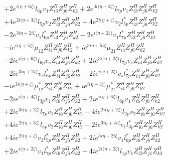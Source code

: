 \begin{align}
 &+2 e^{i \Big(\eta +6 \zeta \Big)} l_{6p} v_1 Z_{{i 3}}^{H} Z_{{j 6}}^{H} Z_{{k 2}}^{H} +2 e^{3 i \Big(\eta +2 \zeta \Big)} l_{7p} v_1 Z_{{i 3}}^{H} Z_{{j 6}}^{H} Z_{{k 2}}^{H} \nonumber \\ 
 &+4 e^{2 i \Big(\eta +3 \zeta \Big)} l_{5p} v_2 Z_{{i 3}}^{H} Z_{{j 6}}^{H} Z_{{k 2}}^{H} -4 e^{2 i \Big(\eta +\zeta \Big)} v_2 l_{5p}^* Z_{{i 3}}^{H} Z_{{j 6}}^{H} Z_{{k 2}}^{H} \nonumber \\ 
 &-2 e^{3 i \eta +2 i \zeta } v_1 l_{6p}^* Z_{{i 3}}^{H} Z_{{j 6}}^{H} Z_{{k 2}}^{H} -2 e^{i \Big(\eta +2 \zeta \Big)} v_1 l_{7p}^* Z_{{i 3}}^{H} Z_{{j 6}}^{H} Z_{{k 2}}^{H} \nonumber \\ 
 &-i e^{i \Big(\eta +5 \zeta \Big)} \mu_{12} Z_{{i 4}}^{H} Z_{{j 6}}^{H} Z_{{k 2}}^{H} +i e^{3 i \eta +5 i \zeta } \mu_{21} Z_{{i 4}}^{H} Z_{{j 6}}^{H} Z_{{k 2}}^{H} \nonumber \\ 
 &-2 i e^{i \Big(\eta +6 \zeta \Big)} l_{6p} v_s Z_{{i 4}}^{H} Z_{{j 6}}^{H} Z_{{k 2}}^{H} +2 i e^{3 i \Big(\eta +2 \zeta \Big)} l_{7p} v_s Z_{{i 4}}^{H} Z_{{j 6}}^{H} Z_{{k 2}}^{H} \nonumber \\ 
 &-2 i e^{3 i \eta +2 i \zeta } v_s l_{6p}^* Z_{{i 4}}^{H} Z_{{j 6}}^{H} Z_{{k 2}}^{H} +2 i e^{i \Big(\eta +2 \zeta \Big)} v_s l_{7p}^* Z_{{i 4}}^{H} Z_{{j 6}}^{H} Z_{{k 2}}^{H} \nonumber \\ 
 &-i e^{3 i \Big(\eta +\zeta \Big)} \mu_{12}^* Z_{{i 4}}^{H} Z_{{j 6}}^{H} Z_{{k 2}}^{H} +i e^{i \Big(\eta +3 \zeta \Big)} \mu_{21}^* Z_{{i 4}}^{H} Z_{{j 6}}^{H} Z_{{k 2}}^{H} \nonumber \\ 
 &-2 i e^{i \Big(\eta +4 \zeta \Big)} l_{3p} v_1 Z_{{i 6}}^{H} Z_{{j 6}}^{H} Z_{{k 2}}^{H} +2 i e^{i \Big(\eta +6 \zeta \Big)} l_{6p} v_1 Z_{{i 6}}^{H} Z_{{j 6}}^{H} Z_{{k 2}}^{H} \nonumber \\ 
 &+2 i e^{3 i \Big(\eta +2 \zeta \Big)} l_{7p} v_1 Z_{{i 6}}^{H} Z_{{j 6}}^{H} Z_{{k 2}}^{H} -4 i e^{2 i \Big(\eta +2 \zeta \Big)} l_{2p} v_2 Z_{{i 6}}^{H} Z_{{j 6}}^{H} Z_{{k 2}}^{H} \nonumber \\ 
 &+4 i e^{2 i \Big(\eta +3 \zeta \Big)} l_{5p} v_2 Z_{{i 6}}^{H} Z_{{j 6}}^{H} Z_{{k 2}}^{H} -2 i e^{3 i \eta +4 i \zeta } v_1 l_{3p}^* Z_{{i 6}}^{H} Z_{{j 6}}^{H} Z_{{k 2}}^{H} \nonumber \\ 
 &+4 i e^{2 i \Big(\eta +\zeta \Big)} v_2 l_{5p}^* Z_{{i 6}}^{H} Z_{{j 6}}^{H} Z_{{k 2}}^{H} +2 i e^{3 i \eta +2 i \zeta } v_1 l_{6p}^* Z_{{i 6}}^{H} Z_{{j 6}}^{H} Z_{{k 2}}^{H} \nonumber \\ 
 &+2 i e^{i \Big(\eta +2 \zeta \Big)} v_1 l_{7p}^* Z_{{i 6}}^{H} Z_{{j 6}}^{H} Z_{{k 2}}^{H} -4 i e^{2 i \Big(\eta +2 \zeta \Big)} l_{1p} v_1 Z_{{i 3}}^{H} Z_{{j 1}}^{H} Z_{{k 3}}^{H} \nonumber \\ 

\end{align}
